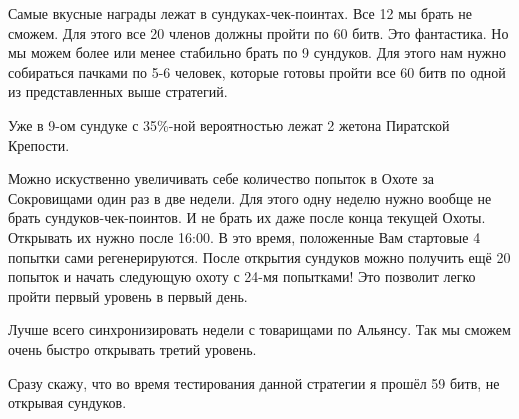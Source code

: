 Самые вкусные награды лежат в сундуках-чек-поинтах. Все 12 мы брать не сможем. 
Для этого все 20 членов должны пройти по 60 битв. Это фантастика. 
Но мы можем более или менее стабильно брать по 9 сундуков. 
Для этого нам нужно собираться пачками по 5-6 человек, которые готовы пройти все 60 битв по одной из представленных выше стратегий.

Уже в 9-ом сундуке с 35\%-ной вероятностью лежат 2 жетона Пиратской Крепости.

Можно искуственно увеличивать себе количество попыток в Охоте за Сокровищами один раз в две недели.
Для этого одну неделю нужно вообще не брать сундуков-чек-поинтов.
И не брать их даже после конца текущей Охоты.
Открывать их нужно после 16:00.
В это время, положенные Вам стартовые 4 попытки сами регенерируются.
После открытия сундуков можно получить ещё 20 попыток и начать следующую охоту с 24-мя попытками!
Это позволит легко пройти первый уровень в первый день.

Лучше всего синхронизировать недели с товарищами по Альянсу.
Так мы сможем очень быстро открывать третий уровень.

Сразу скажу, что во время тестирования данной стратегии я прошёл 59 битв, не открывая сундуков.
